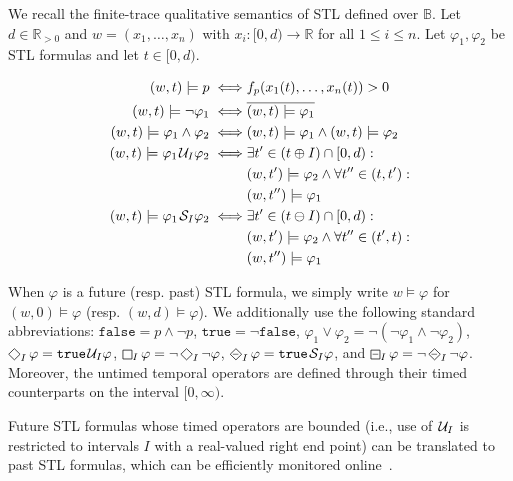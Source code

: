 \documentclass[iicol,lineno]{sn-jnl}
\newcommand{\true}{\texttt{true}}
\newcommand{\false}{\texttt{false}}
\newcommand{\R}{\mathbb{R}}
\newcommand{\B}{\mathbb{B}}
\renewcommand{\LTLf}{\LTLdiamond}
\renewcommand{\LTLg}{\LTLsquare}
\def\until{\kern.1em\mathcal{U}}
\def\since{\kern.1em\mathcal{S}}
\newcommand{\?}{\text{?}}
\begin{document}
	We recall the finite-trace qualitative semantics of STL defined over $\B$.
	Let $d \in \R_{> 0}$ and $w = (x_1, \ldots, x_n)$ with $x_i : [0,d) \to \R$ for all $1 \leq i \leq n$.
	Let $\varphi_1, \varphi_2$ be STL formulas and let $t \in [0,d)$.
	
	\begin{align*}
		(w,t) \models p \iff & f_p(x_1(t), \ldots, x_n(t)) > 0 \\
		(w,t) \models \lnot \varphi_1 \iff & \overline{(w,t) \models \varphi_1} \\
		(w,t) \models \varphi_1 \land \varphi_2 \iff & (w,t) \models \varphi_1 \land (w,t) \models \varphi_2 \\
		(w,t) \models \varphi_1 \until_I \varphi_2 \iff & \exists t' \in (t \oplus I) \cap [0,d) :  \\
		& (w,t') \models \varphi_2 \land \forall t'' \in (t, t') : \\
		& (w,t'') \models \varphi_1\\
		(w,t) \models \varphi_1 \since_I \varphi_2 \iff & \exists t' \in (t \ominus I) \cap [0,d) :  \\
		& (w,t') \models \varphi_2 \land \forall t'' \in (t', t) : \\
		& (w,t'') \models \varphi_1
	\end{align*}
	
	When $\varphi$ is a future (resp. past) STL formula, we simply write $w \models \varphi$ for $(w,0) \models \varphi$ (resp. $(w,d) \models \varphi$).
	We additionally use the following standard abbreviations: 
	$\false = p \land \lnot p$,
	$\true = \lnot \false$,
	$ \varphi_1 \lor \varphi_2 = \lnot (\lnot \varphi_1 \land \lnot \varphi_2)$,
	$\LTLf_I \varphi = \true \until_I \varphi$,
	$\LTLg_I \varphi = \lnot \LTLf_I \lnot \varphi$,
	$\LTLdiamondminus_I \varphi = \true \since_I \varphi$, and
	$\LTLsquareminus_I \varphi = \lnot \LTLdiamondminus_I \lnot \varphi$.
	Moreover, the untimed temporal operators are defined through their timed counterparts on the interval $[0,\infty)$.
	
	Future STL formulas whose timed operators are bounded (i.e., use of $\until_I$ is restricted to intervals $I$ with a real-valued right end point) can be translated to past STL formulas, which can be efficiently monitored online~\cite{MalerNP07,JaksicBGKNN15,Gol18}.
\end{document}
